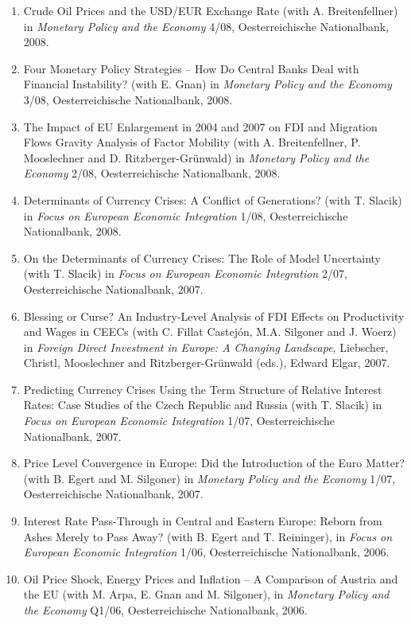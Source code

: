 \documentclass[10pt]{res} %
\begin{document}
\begin{resume}
\begin{enumerate}
\item Crude Oil Prices and the USD/EUR Exchange Rate (with A. Breitenfellner) in \textit{Monetary Policy and the Economy} 4/08, Oesterreichische Nationalbank, 2008.
\item Four Monetary Policy Strategies -- How Do Central Banks Deal with Financial Instability? (with E. Gnan) in \textit{Monetary Policy and the Economy} 3/08, Oesterreichische Nationalbank, 2008.
\item The Impact of EU Enlargement in 2004 and 2007 on FDI and Migration Flows Gravity Analysis of Factor Mobility (with A. Breitenfellner, P. Mooslechner and D. Ritzberger-Gr\"unwald) in \textit{Monetary Policy and the Economy} 2/08, Oesterreichische Nationalbank, 2008.
\item Determinants of Currency Crises: A Conflict of Generations? (with T. Slacik) in \textit{Focus on European Economic Integration} 1/08, Oesterreichische Nationalbank, 2008.
\item On the Determinants of Currency Crises: The Role of Model Uncertainty (with T. Slacik) in \textit{Focus on European Economic Integration} 2/07, Oesterreichische Nationalbank, 2007.
\item Blessing or Curse? An Industry-Level Analysis of FDI Effects on Productivity and Wages in CEECs (with C. Fillat Castej\'on, M.A. Silgoner and J. Woerz) in \textit{Foreign Direct Investment in Europe: A Changing Landscape}, Liebscher, Christl, Mooslechner and Ritzberger-Gr\"unwald (eds.), Edward Elgar, 2007.
\item Predicting Currency Crises Using the Term Structure of Relative Interest Rates: Case Studies of the Czech Republic and Russia (with T. Slacik) in \textit{Focus on European Economic Integration} 1/07, Oesterreichische Nationalbank, 2007.
\item Price Level Convergence in Europe: Did the Introduction of the Euro Matter? (with B. Egert and M. Silgoner) in \textit{Monetary Policy and the Economy} 1/07, Oesterreichische Nationalbank, 2007.
\item Interest Rate Pass-Through in Central and Eastern Europe: Reborn from Ashes Merely to Pass Away? (with B. Egert and T. Reininger), in \textit{Focus on European Economic Integration} 1/06, Oesterreichische Nationalbank, 2006.
\item Oil Price Shock, Energy Prices and Inflation -- A Comparison of Austria and the EU (with M. Arpa, E. Gnan and M. Silgoner), in \textit{Monetary Policy and the Economy} Q1/06, Oesterreichische Nationalbank, 2006.

\end{enumerate}
\end{resume}
\end{document}
